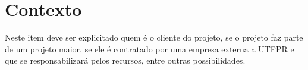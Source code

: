 \chapter{Contexto}\label{cap:contexto}

Neste item deve ser explicitado quem é o cliente do projeto, se o projeto faz parte de um projeto maior, se ele é contratado por uma empresa externa a UTFPR e que se responsabilizará pelos recursos, entre outras possibilidades.